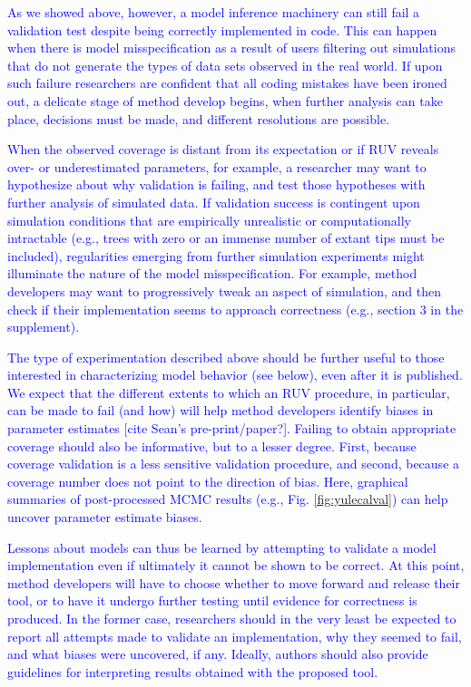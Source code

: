 \documentclass[oneside]{article}
\begin{document}
\textcolor{blue}{As we showed above, however, a model inference machinery can still fail a validation test despite being correctly implemented in code.
This can happen when there is model misspecification as a result of users filtering out simulations that do not generate the types of data sets observed in the real world.
If upon such failure researchers are confident that all coding mistakes have been ironed out, a delicate stage of method develop begins, when further analysis can take place, decisions must be made, and different resolutions are possible.}

\textcolor{blue}{When the observed coverage is distant from its expectation or if RUV reveals over- or underestimated parameters, for example, a researcher may want to hypothesize about why validation is failing, and test those hypotheses with further analysis of simulated data.
If validation success is contingent upon simulation conditions that are empirically unrealistic or computationally intractable (e.g., trees with zero or an immense number of extant tips must be included), regularities emerging from further simulation experiments might illuminate the nature of the model misspecification.
For example, method developers may want to progressively tweak an aspect of simulation, and then check if their implementation seems to approach correctness (e.g., section 3 in the supplement).}

\textcolor{blue}{The type of experimentation described above should be further useful to those interested in characterizing model behavior (see below), even after it is published.
We expect that the different extents to which an RUV procedure, in particular, can be made to fail (and how) will help method developers identify biases in parameter estimates [cite Sean's pre-print/paper?].
Failing to obtain appropriate coverage should also be informative, but to a lesser degree.
First, because coverage validation is a less sensitive validation procedure, and second, because a coverage number does not point to the direction of bias.
Here, graphical summaries of post-processed MCMC results (e.g., Fig. \ref{fig:yulecalval}) can help uncover parameter estimate biases.}

\textcolor{blue}{Lessons about models can thus be learned by attempting to validate a model implementation even if ultimately it cannot be shown to be correct.
At this point, method developers will have to choose whether to move forward and release their tool, or to have it undergo further testing until evidence for correctness is produced.
In the former case, researchers should in the very least be expected to report all attempts made to validate an implementation, why they seemed to fail, and what biases were uncovered, if any.
Ideally, authors should also provide guidelines for interpreting results obtained with the proposed tool.}
\end{document}
